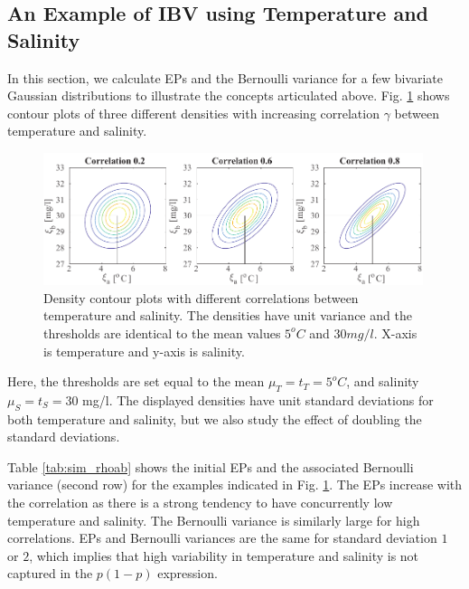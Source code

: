 \documentclass[aoas]{imsart}
\begin{document}
\subsection{An Example of IBV using Temperature and Salinity}

In this section, we calculate EPs and the Bernoulli variance for a few bivariate
Gaussian distributions to illustrate the concepts articulated above.
Fig. \ref{illus_bivarDens} shows contour plots of three different
densities with increasing correlation $\gamma$ between temperature and
salinity.
\begin{figure}[h!] \centering
  \includegraphics[width=0.99\textwidth]{Figures/illus_bivar.pdf}
  \caption{Density contour plots with different correlations between
    temperature and salinity. The densities have unit variance and the
    thresholds are identical to the mean values $5^o C$ and
    $30 mg/l$. X-axis is temperature and y-axis is salinity.}
\label{illus_bivarDens}
\end{figure}
Here, the thresholds are set equal to the mean $\mu_T=t_T=5^o C$, and
salinity $\mu_S=t_S=30$ mg/l. The displayed densities have unit
standard deviations for both temperature and salinity, but we also
study the effect of doubling the standard deviations.

Table \ref{tab:sim_rhoab} shows the initial EPs and the associated Bernoulli
variance (second row) for the examples indicated in
Fig. \ref{illus_bivarDens}. The EPs increase with the correlation as
there is a strong tendency to have concurrently low temperature and
salinity. The Bernoulli variance is similarly large for high
correlations. EPs and Bernoulli variances are the same for standard
deviation $1$ or $2$, which implies that high variability in
temperature and salinity is not captured in the $p(1-p)$ expression.
\end{document}
